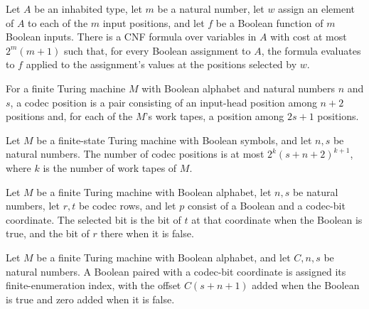 \begin{theorem}
\label{Complexity.codecLocalCheck}
\leanok
{}
Let $A$ be an inhabited type, let $m$ be a natural number, let $w$ assign an element of
$A$ to each of the $m$ input positions, and let $f$ be a Boolean function of $m$ Boolean
inputs. There is a CNF formula over variables in $A$ with cost at most $2^m(m+1)$ such
that, for every Boolean assignment to $A$, the formula evaluates to $f$ applied to the
assignment's values at the positions selected by $w$.
\end{theorem}

\begin{definition}
\label{Complexity.CodecPositions}
\leanok
{}
For a finite Turing machine $M$ with Boolean alphabet and natural numbers $n$ and $s$, a
codec position is a pair consisting of an input-head position among $n+2$ positions and,
for each of the $M$'s work tapes, a position among $2s+1$ positions.
\end{definition}

\begin{theorem}
\label{Complexity.codecPositions_card_le}
\leanok
{}
Let $M$ be a finite-state Turing machine with Boolean symbols, and let $n,s$ be natural
numbers. The number of codec positions is at most $2^k(s+n+2)^{k+1}$, where $k$ is the
number of work tapes of $M$.
\end{theorem}

\begin{definition}
\label{Complexity.codecPairBits}
\leanok
{}
Let $M$ be a finite Turing machine with Boolean alphabet, let $n,s$ be natural numbers,
let $r,t$ be codec rows, and let $p$ consist of a Boolean and a codec-bit coordinate.
The selected bit is the bit of $t$ at that coordinate when the Boolean is true, and the
bit of $r$ there when it is false.
\end{definition}

\begin{definition}
\label{Complexity.codecPairWire}
\leanok
{}
Let $M$ be a finite Turing machine with Boolean alphabet, and let $C,n,s$ be natural
numbers. A Boolean paired with a codec-bit coordinate is assigned its finite-enumeration
index, with the offset $C(s+n+1)$ added when the Boolean is true and zero added when it
is false.
\end{definition}

